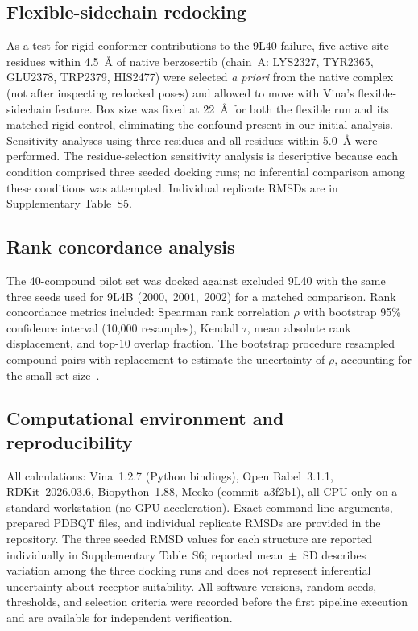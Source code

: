 \documentclass[global,twocolumn]{svjour}
\begin{document}
\subsection{Flexible-sidechain redocking}

As a test for rigid-conformer contributions to the 9L40 failure, five
active-site residues within 4.5~\AA{} of native berzosertib (chain~A:
LYS2327, TYR2365, GLU2378, TRP2379, HIS2477) were selected \emph{a priori}
from the native complex (not after inspecting redocked poses) and allowed to
move with Vina's flexible-sidechain feature. Box size was fixed at 22~\AA{}
for both the flexible run and its matched rigid control, eliminating the
confound present in our initial analysis. Sensitivity analyses using three
residues and all residues within 5.0~\AA{} were performed. The
residue-selection sensitivity analysis is descriptive because each condition
comprised three seeded docking runs; no inferential comparison among these
conditions was attempted. Individual replicate RMSDs are in Supplementary
Table~S5.

\subsection{Rank concordance analysis}

The 40-compound pilot set was docked against excluded 9L40 with the same
three seeds used for 9L4B (2000,~2001,~2002) for a matched comparison. Rank
concordance metrics included: Spearman rank correlation $\rho$ with
bootstrap 95\% confidence interval (10,000 resamples), Kendall $\tau$,
mean absolute rank displacement, and top-10 overlap fraction. The bootstrap
procedure resampled compound pairs with replacement to estimate the
uncertainty of $\rho$, accounting for the small set size~\cite{efron1993}.

\subsection{Computational environment and reproducibility}

All calculations: Vina~1.2.7 (Python bindings), Open Babel~3.1.1,
RDKit~2026.03.6, Biopython~1.88, Meeko (commit~a3f2b1), all CPU only on a
standard workstation (no GPU acceleration). Exact command-line arguments,
prepared PDBQT files, and individual replicate RMSDs are provided in the
repository. The three seeded RMSD values for each structure are reported
individually in Supplementary Table~S6; reported mean~$\pm$~SD describes
variation among the three docking runs and does not represent inferential
uncertainty about receptor suitability. All software versions, random seeds,
thresholds, and selection criteria were recorded before the first pipeline
execution and are available for independent verification.
\end{document}
